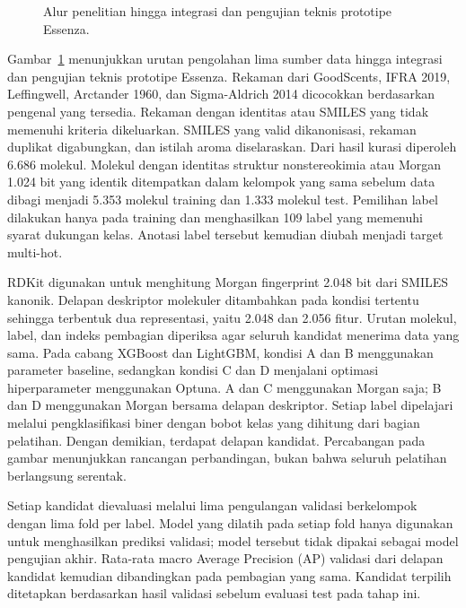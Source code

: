 \begin{figure}[p]
\centering
\resizebox{\textwidth}{!}{\def\alurEmbed{}}
\caption{Alur penelitian hingga integrasi dan pengujian teknis prototipe Essenza.}
\label{fig:alur_penelitian_baru}
\end{figure}

Gambar~\ref{fig:alur_penelitian_baru} menunjukkan urutan pengolahan lima sumber data hingga integrasi dan pengujian teknis prototipe Essenza. Rekaman dari GoodScents, IFRA 2019, Leffingwell, Arctander 1960, dan Sigma-Aldrich 2014 dicocokkan berdasarkan pengenal yang tersedia. Rekaman dengan identitas atau SMILES yang tidak memenuhi kriteria dikeluarkan. SMILES yang valid dikanonisasi, rekaman duplikat digabungkan, dan istilah aroma diselaraskan. Dari hasil kurasi diperoleh 6.686 molekul. Molekul dengan identitas struktur nonstereokimia atau Morgan 1.024 bit yang identik ditempatkan dalam kelompok yang sama sebelum data dibagi menjadi 5.353 molekul training dan 1.333 molekul test. Pemilihan label dilakukan hanya pada training dan menghasilkan 109 label yang memenuhi syarat dukungan kelas. Anotasi label tersebut kemudian diubah menjadi target multi-hot.

RDKit digunakan untuk menghitung Morgan fingerprint 2.048 bit dari SMILES kanonik. Delapan deskriptor molekuler ditambahkan pada kondisi tertentu sehingga terbentuk dua representasi, yaitu 2.048 dan 2.056 fitur. Urutan molekul, label, dan indeks pembagian diperiksa agar seluruh kandidat menerima data yang sama. Pada cabang XGBoost dan LightGBM, kondisi A dan B menggunakan parameter baseline, sedangkan kondisi C dan D menjalani optimasi hiperparameter menggunakan Optuna. A dan C menggunakan Morgan saja; B dan D menggunakan Morgan bersama delapan deskriptor. Setiap label dipelajari melalui pengklasifikasi biner dengan bobot kelas yang dihitung dari bagian pelatihan. Dengan demikian, terdapat delapan kandidat. Percabangan pada gambar menunjukkan rancangan perbandingan, bukan bahwa seluruh pelatihan berlangsung serentak.

Setiap kandidat dievaluasi melalui lima pengulangan validasi berkelompok dengan lima fold per label. Model yang dilatih pada setiap fold hanya digunakan untuk menghasilkan prediksi validasi; model tersebut tidak dipakai sebagai model pengujian akhir. Rata-rata macro Average Precision (AP) validasi dari delapan kandidat kemudian dibandingkan pada pembagian yang sama. Kandidat terpilih ditetapkan berdasarkan hasil validasi sebelum evaluasi test pada tahap ini.

